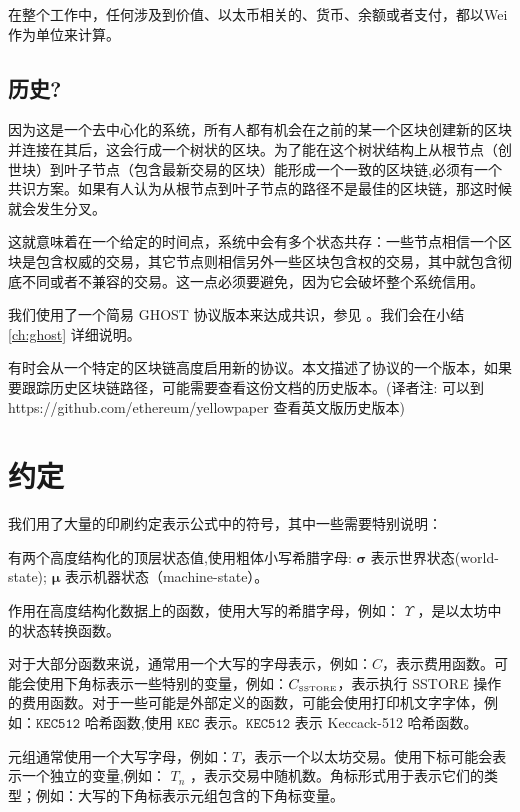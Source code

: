 \documentclass[9pt,oneside]{amsart}
\begin{document}
\begin{multicols}{2}
在整个工作中，任何涉及到价值、以太币相关的、货币、余额或者支付，都以Wei作为单位来计算。

\subsection{历史?}

因为这是一个去中心化的系统，所有人都有机会在之前的某一个区块创建新的区块并连接在其后，这会行成一个树状的区块。为了能在这个树状结构上从根节点（创世块）到叶子节点（包含最新交易的区块）能形成一个一致的区块链,必须有一个共识方案。如果有人认为从根节点到叶子节点的路径不是最佳的区块链，那这时候就会发生分叉。

这就意味着在一个给定的时间点，系统中会有多个状态共存：一些节点相信一个区块是包含权威的交易，其它节点则相信另外一些区块包含权的交易，其中就包含彻底不同或者不兼容的交易。这一点必须要避免，因为它会破坏整个系统信用。


我们使用了一个简易 GHOST 协议版本来达成共识，参见 \cite{cryptoeprint:2013:881} 。我们会在小结 \ref{ch:ghost} 详细说明。

有时会从一个特定的区块链高度启用新的协议。本文描述了协议的一个版本，如果要跟踪历史区块链路径，可能需要查看这份文档的历史版本。(译者注: 可以到 https://github.com/ethereum/yellowpaper 查看英文版历史版本)

\section{约定}\label{ch:conventions}

我们用了大量的印刷约定表示公式中的符号，其中一些需要特别说明：

有两个高度结构化的顶层状态值,使用粗体小写希腊字母: $\boldsymbol{\sigma}$  表示世界状态(world-state);  $\boldsymbol{\mu}$ 表示机器状态（machine-state）。

作用在高度结构化数据上的函数，使用大写的希腊字母，例如： $\Upsilon$ ，是以太坊中的状态转换函数。

对于大部分函数来说，通常用一个大写的字母表示，例如：$C$，表示费用函数。可能会使用下角标表示一些特别的变量，例如：$C_\text{\tiny SSTORE}$，表示执行 {\tiny SSTORE} 操作的费用函数。对于一些可能是外部定义的函数，可能会使用打印机文字字体，例如：$\texttt{KEC512}$ 哈希函数,使用 $\texttt{KEC}$ 表示。$\texttt{KEC512}$  表示 Keccack-512 哈希函数。

元组通常使用一个大写字母，例如：$T$，表示一个以太坊交易。使用下标可能会表示一个独立的变量,例如： $T_n$ ，表示交易中随机数。角标形式用于表示它们的类型；例如：大写的下角标表示元组包含的下角标变量。


\end{multicols}
\end{document}
